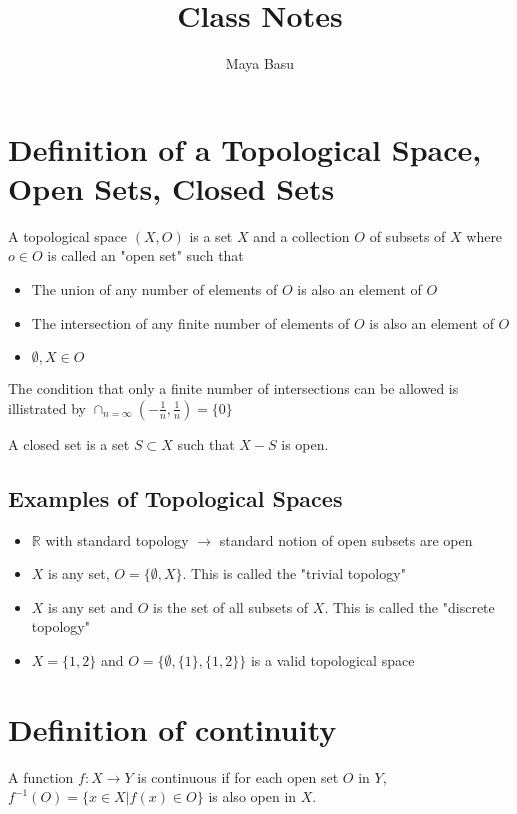\documentclass{homework}
\author{Maya Basu}
\title{Class Notes}
\begin{document}
 \maketitle

\section{Definition of a Topological Space, Open Sets, Closed Sets}

A topological space $(X, O)$ is a set $X$ and a collection $O$ of subsets of $X$ where $o \in O$ is called an "open set" such that
\begin{itemize}
\item{The union of any number of elements of $O$ is also an element of $O$}
\item{The intersection of any finite number of elements of $O$ is also an element of $O$}
\item{$\emptyset , X \in O$}
\end{itemize}
The condition that only a finite number of intersections can be allowed is illistrated by $\cap_{n = \infty} \left( -\frac{1}{n},\frac{1}{n}\right) = \{0\}$

A closed set is a set $S \subset X$ such that $X-S$ is open.

\subsection{Examples of Topological Spaces}
\begin{itemize}
\item{$\mathbb{R}$ with standard topology $\rightarrow$ standard notion of open subsets are open}
\item{$X$ is any set, $O = \{\emptyset,X\}$. This is called the "trivial topology"}
\item{$X$ is any set and $O$ is the set of all subsets of $X$. This is called the "discrete topology"}
\item{$X = \{1,2\}$ and $O = \{\emptyset, \{1\}, \{1,2\}\}$ is a valid topological space}
\end{itemize}

\section{Definition of continuity}
A function $f: X \rightarrow Y$ is continuous if for each open set $O$ in $Y$, $f^{-1}(O) = \{x \in X | f(x) \in O\}$ is also open in $X$.
\end{document}

